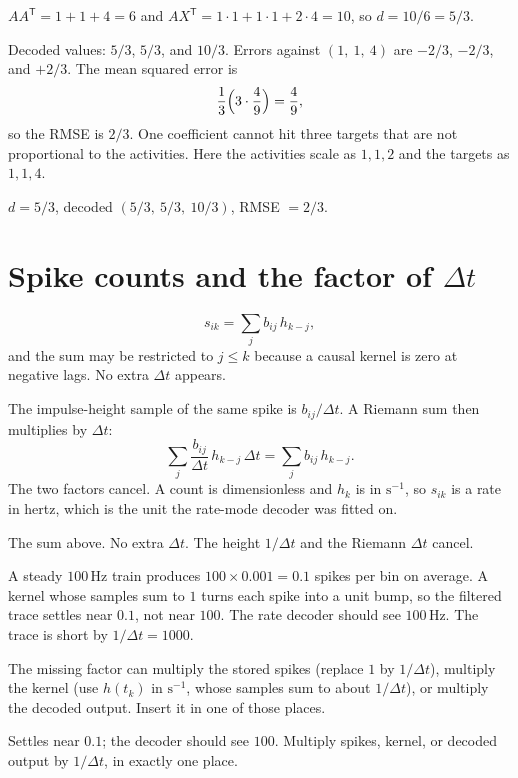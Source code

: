 \documentclass[11pt,letterpaper]{article}
\newcommand{\T}{\mathsf{T}}
\newcommand{\ans}[1]{\par\vspace{2pt}{\bfseries #1}\quad}
\begin{document}
\ans{2.}
$AA^{\T} = 1 + 1 + 4 = 6$ and $AX^{\T} = 1\cdot 1 + 1\cdot 1 + 2\cdot 4 = 10$, so $d = 10/6 = 5/3$.

Decoded values: $5/3$, $5/3$, and $10/3$. Errors against $(1,\ 1,\ 4)$ are $-2/3$, $-2/3$, and $+2/3$. The mean squared error is
\[
\frac{1}{3}\Bigl(3\cdot\frac{4}{9}\Bigr) = \frac{4}{9},
\]
so the RMSE is $2/3$. One coefficient cannot hit three targets that are not proportional to the activities. Here the activities scale as $1,1,2$ and the targets as $1,1,4$.
\begin{result}
$d = 5/3$, decoded $(5/3,\ 5/3,\ 10/3)$, RMSE $= 2/3$.
\end{result}

\section{Spike counts and the factor of $\Delta t$}

\ans{1.}
\[
s_{ik} = \sum_j b_{ij}\, h_{k-j},
\]
and the sum may be restricted to $j \le k$ because a causal kernel is zero at negative lags. No extra $\Delta t$ appears.

The impulse-height sample of the same spike is $b_{ij}/\Delta t$. A Riemann sum then multiplies by $\Delta t$:
\[
\sum_j \frac{b_{ij}}{\Delta t}\, h_{k-j}\, \Delta t = \sum_j b_{ij}\, h_{k-j}.
\]
The two factors cancel. A count is dimensionless and $h_k$ is in $\mathrm{s}^{-1}$, so $s_{ik}$ is a rate in hertz, which is the unit the rate-mode decoder was fitted on.
\begin{result}
The sum above. No extra $\Delta t$. The height $1/\Delta t$ and the Riemann $\Delta t$ cancel.
\end{result}

\ans{2.}
A steady $100\,\mathrm{Hz}$ train produces $100 \times 0.001 = 0.1$ spikes per bin on average. A kernel whose samples sum to $1$ turns each spike into a unit bump, so the filtered trace settles near $0.1$, not near $100$. The rate decoder should see $100\,\mathrm{Hz}$. The trace is short by $1/\Delta t = 1000$.

The missing factor can multiply the stored spikes (replace $1$ by $1/\Delta t$), multiply the kernel (use $h(t_k)$ in $\mathrm{s}^{-1}$, whose samples sum to about $1/\Delta t$), or multiply the decoded output. Insert it in one of those places.
\begin{result}
Settles near $0.1$; the decoder should see $100$. Multiply spikes, kernel, or decoded output by $1/\Delta t$, in exactly one place.
\end{result}
\end{document}

